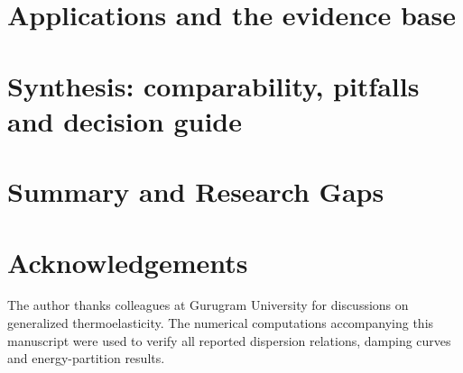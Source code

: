 \documentclass[12pt,a4paper]{article}
\begin{document}
\section{Applications and the evidence base}\label{sec:part_apps}
\demoteopen



\demoteclose

\section{Synthesis: comparability, pitfalls and decision guide}\label{sec:part_synth}
\demoteopen


\demoteclose

\section{Summary and Research Gaps}\label{sec:part_concl}
\demoteopen

\demoteclose


\newpage

\section*{Acknowledgements}
The author thanks colleagues at Gurugram University for discussions on generalized thermoelasticity. The numerical computations accompanying this manuscript were used to verify all reported dispersion relations, damping curves and energy-partition results.





\appendix
\label{app:balance_ref}
\label{app:disp_ref}
\label{app:numbers_ref}
\label{app:repro_ref}
\label{app:catalogue_ref}
\label{app:glossary_ref}
\label{app:debye_ref}
\label{app:params_ref}
\label{app:registry_ref}
\label{app:eqreg_ref}



\clearpage


\end{document}
